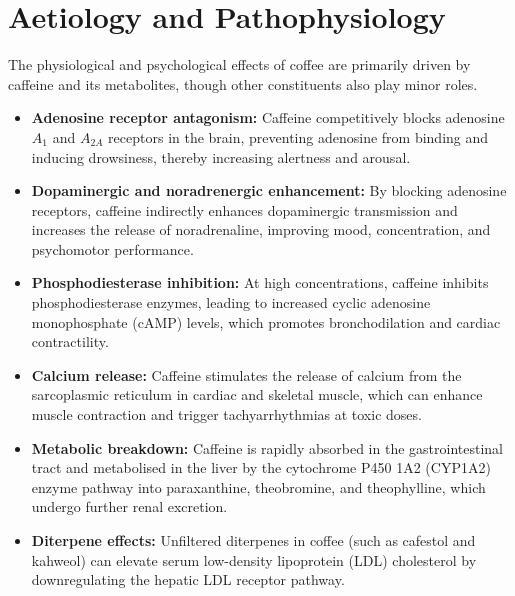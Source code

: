 \section*{Aetiology and Pathophysiology}
The physiological and psychological effects of coffee are primarily driven by caffeine and its metabolites, though other constituents also play minor roles.
\begin{itemize}
    \item \textbf{Adenosine receptor antagonism:} Caffeine competitively blocks adenosine $A_{1}$ and $A_{2A}$ receptors in the brain, preventing adenosine from binding and inducing drowsiness, thereby increasing alertness and arousal.
    \item \textbf{Dopaminergic and noradrenergic enhancement:} By blocking adenosine receptors, caffeine indirectly enhances dopaminergic transmission and increases the release of noradrenaline, improving mood, concentration, and psychomotor performance.
    \item \textbf{Phosphodiesterase inhibition:} At high concentrations, caffeine inhibits phosphodiesterase enzymes, leading to increased cyclic adenosine monophosphate (cAMP) levels, which promotes bronchodilation and cardiac contractility.
    \item \textbf{Calcium release:} Caffeine stimulates the release of calcium from the sarcoplasmic reticulum in cardiac and skeletal muscle, which can enhance muscle contraction and trigger tachyarrhythmias at toxic doses.
    \item \textbf{Metabolic breakdown:} Caffeine is rapidly absorbed in the gastrointestinal tract and metabolised in the liver by the cytochrome P450 1A2 (CYP1A2) enzyme pathway into paraxanthine, theobromine, and theophylline, which undergo further renal excretion.
    \item \textbf{Diterpene effects:} Unfiltered diterpenes in coffee (such as cafestol and kahweol) can elevate serum low-density lipoprotein (LDL) cholesterol by downregulating the hepatic LDL receptor pathway.
\end{itemize}

